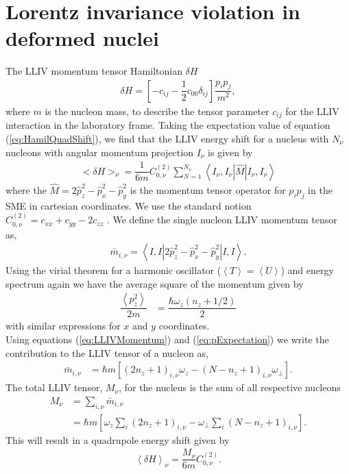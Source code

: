 \documentclass[10pt,a4paper, twoside, openright]{report}
\begin{document}
\section{Lorentz invariance violation  in deformed nuclei} 
The LLIV momentum tensor Hamiltonian $\delta H$  \cite{Kostelecky1999}
\begin{align} \label{eq:HamilQuadShift}
\delta H = \left[-c_{ij} -\dfrac{1}{2}c_{00}\delta_{ij}\right]\dfrac{p_ip_j}{m^2},
\end{align}
 where $m$ is the nucleon mass,  to describe the tensor parameter $c_{ij}$  for the LLIV interaction \cite{Kostelecky1999} in the laboratory frame. 
Taking the expectation value of equation (\ref{eq:HamilQuadShift}), we find that the LLIV energy shift  for a nucleus with $N_{\nu}$ nucleons with angular momentum projection $I_{\nu}$ is given by 
\begin{align} \label{eq:MomentumEnergyShift}
<\delta H>_{\nu} = \dfrac{1}{6m}C_{0, \nu}^{(2)}\sum_{N=1}^{N_{\nu}}\left<I_{\nu},I_{\nu}\left|\hat{M}\right|I_{\nu},I_{\nu}\right> 
\end{align}
where the $\hat{M} = 2\hat{p}_z^2 - \hat{p}_x^2 - \hat{p}_y^2$ is the momentum tensor operator for $p_ip_j$ in the SME in cartesian coordinates. We use the standard notion $C_{0, \nu}^{(2)} = c_{xx} + c_{yy} -2c_{zz}$ \cite{Kostelecky1999}. We define the single nucleon LLIV momentum tensor as,
\begin{align} \label{eq:LLIVMomentum}
\bar{m}_{i, \nu} =  \left<I,I\left|2\hat{p}_z^2 - \hat{p}_x^2 - \hat{p}_y^2\right|I,I\right>.
\end{align}
Using the virial theorem for a harmonic oscillator ($\left<T\right>=\left<U\right>$) and energy spectrum again we have the average square of the momentum given by
\begin{align} 
\dfrac{\left<p_z^2\right>}{2m} &= \dfrac{\hbar\omega_z\left(n_z + 1/2\right)}{2} \label{eq:pExpectation}
\end{align}
with similar expressions for $x$ and $y$ coordinates. \\
\linebreak
Using equations (\ref{eq:LLIVMomentum}) and (\ref{eq:pExpectation}) we write the contribution to the LLIV tensor of a nucleon as,
\begin{align} \label{eq:MDimensionful}
\bar{m}_{i,\nu} &= \hbar m\left[\left(2n_z + 1\right)_{i,\nu}\omega_z - \left(N - n_z + 1\right)_{i,\nu}\omega_{\perp}\right].
\end{align}
The total LLIV tensor, $M_{\nu}$,  for the nucleus is the sum of all respective nucleons
\begin{align}
M_{\nu} &= \sum_{i,\nu} \bar{m}_{i,\nu} \nonumber \\
&= \hbar m\left[\omega_z\sum_{i}\left(2n_z + 1\right)_{i,\nu} - \omega_{\perp}\sum_{i}\left(N - n_z + 1\right)_{i,\nu}\right]. \label{eq:CollectiveQDim}
\end{align}
This will result in a quadrupole energy shift given by
\begin{align} \label{eq:LLIVEnergyShift}
\left<\delta H\right>_{\nu} = \dfrac{M_{\nu}}{6m} C_{0,\nu}^{(2)}.
\end{align}
\end{document}
